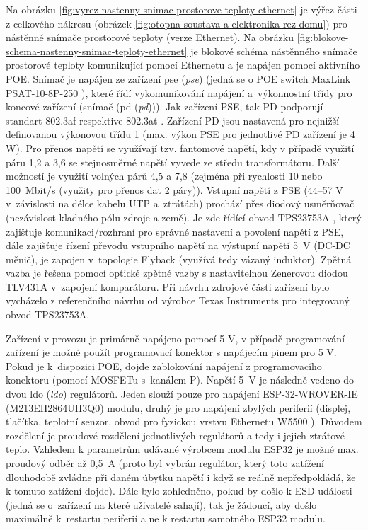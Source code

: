 Na obrázku \ref{fig:vyrez-nastenny-snimac-prostorove-teploty-ethernet} je výřez části z celkového nákresu (obrázek \ref{fig:otopna-soustava-a-elektronika-rez-domu}) pro nástěnné snímače prostorové teploty (verze Ethernet). Na obrázku \ref{fig:blokove-schema-nastenny-snimac-teploty-ethernet} je blokové schéma nástěnného snímače prostorové teploty komunikující pomocí Ethernetu a je napájen pomocí aktivního POE. Snímač je napájen ze zařízení \acrshort{pse} (\textit{\acrlong{pse}}) (jedná se o POE switch MaxLink PSAT-10-8P-250 \cite{maxlink-psat-10-8p-250}), které řídí vykomunikování napájení a~výkonnostní třídy pro koncové zařízení (snímač (\acrshort{pd} (\textit{\acrlong{pd}}))). Jak zařízení PSE, tak PD podporují standart 802.3af \cite{norma-802.3af} respektive 802.3at \cite{norma-802.3at}. Zařízení PD jsou nastavená pro nejnižší definovanou výkonovou třídu 1 (max. výkon PSE pro jednotlivé PD zařízení je 4 W). Pro přenos napětí se využívají tzv. fantomové napětí, kdy v případě využití páru 1,2 a 3,6 se stejnosměrné napětí vyvede ze středu transformátoru. Další možností je využití volných párů 4,5 a 7,8 (zejména při rychlosti 10 nebo 100~Mbit/s (využity pro přenos dat 2 páry)). Vstupní napětí z PSE (44–57 V v~závislosti na délce kabelu UTP a~ztrátách) prochází přes diodový usměrňovač (nezávislost kladného pólu zdroje a země). Je zde řídící obvod TPS23753A \cite{tps23753a}, který zajišťuje komunikaci/rozhraní pro správné nastavení a povolení napětí z PSE, dále zajišťuje řízení převodu vstupního napětí na výstupní napětí 5~V (DC-DC měnič), je zapojen v~topologie Flyback (využívá tedy vázaný induktor). Zpětná vazba je řešena pomocí optické zpětné vazby s nastavitelnou Zenerovou diodou TLV431A \cite{tlv431a} v~zapojení komparátoru. Při návrhu zdrojové části zařízení bylo vycházelo z referenčního návrhu od výrobce Texas Instruments pro integrovaný obvod TPS23753A.

Zařízení v provozu je primárně  napájeno pomocí 5 V, v případě programování zařízení je možné použít programovací konektor s napájecím pinem pro 5 V. Pokud je k~dispozici POE, dojde zablokování napájení z programovacího konektoru (pomocí MOSFETu s~kanálem P). Napětí 5~V je následně vedeno do dvou \acrshort{ldo} (\textit{\acrlong{ldo}}) regulátorů. Jeden slouží pouze pro napájení ESP-32-WROVER-IE (M213EH2864UH3Q0) \cite{esp32-wrover-ie} modulu, druhý je pro napájení zbylých periferií (displej, tlačítka, teplotní senzor, obvod pro fyzickou vrstvu Ethernetu W5500 \cite{w5500}). Důvodem rozdělení je proudové rozdělení jednotlivých regulátorů a tedy i jejich ztrátové teplo. Vzhledem k parametrům udávané výrobcem modulu ESP32 je možné max. proudový odběr až 0,5~A (proto byl vybrán regulátor, který toto zatížení dlouhodobě zvládne při daném úbytku napětí i když se reálně nepředpokládá, že k tomuto zatížení dojde). Dále bylo zohledněno, pokud by došlo k ESD události (jedná se o~zařízení na které uživatelé sahají), tak je žádoucí, aby došlo maximálně k~restartu periferií a ne k restartu samotného ESP32 modulu. 

